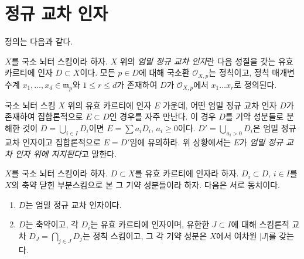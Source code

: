 \section{정규 교차 인자}
\label{section-normal-crossings}

\noindent
정의는 다음과 같다.

\begin{definition}
\label{definition-strict-normal-crossings}
$X$를 국소 뇌터 스킴이라 하자. $X$ 위의
{\it 엄밀 정규 교차 인자}란 다음 성질을 갖는 유효 카르티에 인자
$D \subset X$이다. 모든 $p \in D$에 대해 국소환
$\mathcal{O}_{X, p}$는 정칙이고, 정칙 매개변수계
$x_1, \ldots, x_d \in \mathfrak m_p$와 $1 \leq r \leq d$가 존재하여
$D$가 $\mathcal{O}_{X, p}$에서 $x_1 \ldots x_r$로 정의된다.
\end{definition}

\noindent
국소 뇌터 스킴 $X$ 위의 유효 카르티에 인자 $E$ 가운데,
어떤 엄밀 정규 교차 인자 $D$가 존재하여 집합론적으로
$E \subset D$인 경우를 자주 만난다.
이 경우 $D$를 기약 성분들로 분해한 것이
$D = \bigcup_{i \in I} D_i$이면
$E = \sum a_i D_i$, $a_i \geq 0$이다.
$D' = \bigcup_{a_i > 0} D_i$은 엄밀 정규 교차 인자이고
집합론적으로 $E = D'$임에 유의하라.
위 상황에서는 $E$가 {\it 엄밀 정규 교차 인자 위에 지지된다}고 말한다.

\begin{lemma}
\label{lemma-strict-normal-crossings}
$X$를 국소 뇌터 스킴이라 하자. $D \subset X$를 유효 카르티에 인자라 하자.
$D_i \subset D$, $i \in I$를 $X$의 축약 닫힌 부분스킴으로 본
그 기약 성분들이라 하자. 다음은 서로 동치이다.
\begin{enumerate}
\item $D$는 엄밀 정규 교차 인자이다.
\item $D$는 축약이고, 각 $D_i$는 유효 카르티에 인자이며,
유한한 $J \subset I$에 대해 스킴론적 교차
$D_J = \bigcap_{j \in J} D_j$는 정칙 스킴이고,
그 각 기약 성분은 $X$에서 여차원 $|J|$를 갖는다.
\end{enumerate}
\end{lemma}

